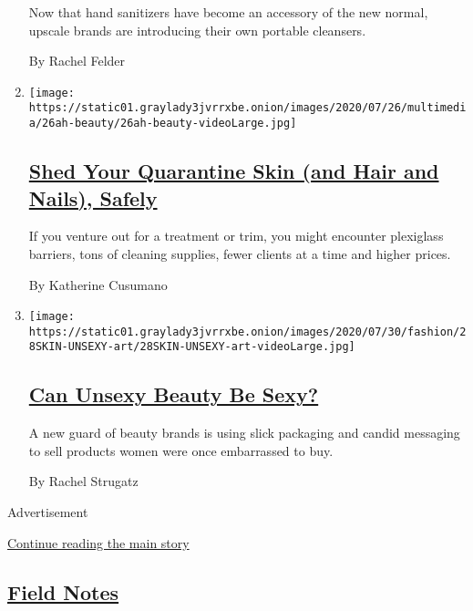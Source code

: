 \begin{enumerate}
  Now that hand sanitizers have become an accessory of the new normal,
  upscale brands are introducing their own portable cleansers.

  By Rachel Felder
\item
  \texttt{[image: https://static01.graylady3jvrrxbe.onion/images/2020/07/26/multimedia/26ah-beauty/26ah-beauty-videoLarge.jpg]}

  \hypertarget{shed-your-quarantine-skin-and-hair-and-nails-safely}{%
  \subsection{\texorpdfstring{\href{/2020/07/25/at-home/coronavirus-salons.html}{Shed
  Your Quarantine Skin (and Hair and Nails),
  Safely}}{Shed Your Quarantine Skin (and Hair and Nails), Safely}}\label{shed-your-quarantine-skin-and-hair-and-nails-safely}}

  If you venture out for a treatment or trim, you might encounter
  plexiglass barriers, tons of cleaning supplies, fewer clients at a
  time and higher prices.

  By Katherine Cusumano
\item
  \texttt{[image: https://static01.graylady3jvrrxbe.onion/images/2020/07/30/fashion/28SKIN-UNSEXY-art/28SKIN-UNSEXY-art-videoLarge.jpg]}

  \hypertarget{can-unsexy-beauty-be-sexy}{%
  \subsection{\texorpdfstring{\href{/2020/07/28/style/can-unsexy-beauty-be-sexy.html}{Can
  Unsexy Beauty Be
  Sexy?}}{Can Unsexy Beauty Be Sexy?}}\label{can-unsexy-beauty-be-sexy}}

  A new guard of beauty brands is using slick packaging and candid
  messaging to sell products women were once embarrassed to buy.

  By Rachel Strugatz
\end{enumerate}

Advertisement

\protect\hyperlink{after-mid3}{Continue reading the main story}

\hypertarget{field-notes-1}{%
\subsection{\texorpdfstring{\href{/column/field-notes}{Field
Notes}}{Field Notes}}\label{field-notes-1}}

